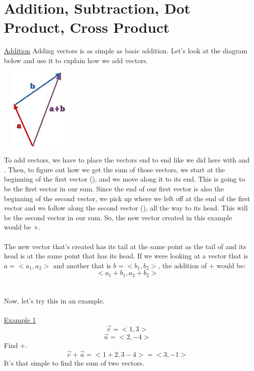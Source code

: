 \documentclass[a4paper,openright, 14pt]{article}
\begin{document}
\section*{Addition, Subtraction, Dot Product, Cross Product}
\underline{Addition}
Adding vectors is as simple as basic addition. Let's look at the diagram below and use it to explain how we add vectors.
\begin{center}
    \includegraphics[width=4cm, height=4cm]{Images/addvector.png}
\end{center}
To add vectors, we have to place the vectors end to end like we did here with  and . Then, to figure out how we get the sum of those vectors, we start at the beginning of the first vector (), and we move along it to its end. This is going to be the first vector in our sum. Since the end of our first vector is also the beginning of the second vector, we pick up where we left off at the end of the first vector and we follow along the second vector (), all the way to its head. This will be the second vector in our sum. So, the new vector created in this example would be +.\\\\
The new vector that's created has its tail at the same point as the tail of  and its head is at the same point that  has its head. If we were looking at a vector that is $a=<a_{1},a_{2}>$ and another that is $b=<b_{1},b_{2}>$, the addition of + would be:
$$<a_{1}+b_{1},a_{2}+b_{2}>$$\\\\
Now, let's try this in an example.\\\\
\underline{Example 1}
$$\overrightarrow{v}=<1,3>$$
$$\overrightarrow{u}=<2,-4>$$
Find +.
$$\overrightarrow{v}+\overrightarrow{u}=<1+2,3-4>=<3,-1>$$
It's that simple to find the sum of two vectors.\\\\
\end{document}
